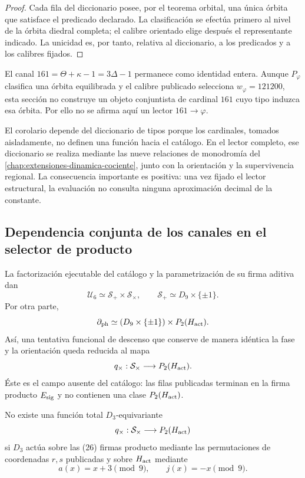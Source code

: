 \begin{proof}
Cada fila del diccionario posee, por el teorema orbital, una única órbita que
satisface el predicado declarado. La clasificación se efectúa primero al
nivel de la órbita diedral completa; el calibre orientado elige después el
representante indicado. La unicidad es, por tanto, relativa al diccionario,
a los predicados y a los calibres fijados.
\end{proof}

El canal \(161=\Theta+\kappa-1=3\Delta-1\) permanece como identidad entera.
Aunque \(P_\varphi\) clasifica una órbita equilibrada y el calibre publicado
selecciona \(w_\varphi=121200\), esta sección no construye un objeto
conjuntista de cardinal \(161\) cuyo tipo induzca esa órbita. Por ello no se
afirma aquí un lector \(161\to\varphi\).

El corolario depende del diccionario de tipos porque los cardinales, tomados
aisladamente, no definen una función hacia el catálogo. En el lector completo,
ese diccionario se realiza mediante las nueve relaciones de monodromía del
\cref{chap:extensiones-dinamica-cociente}, junto con la orientación y la
supervivencia regional. La consecuencia importante es positiva: una vez
fijado el lector estructural, la evaluación no consulta ninguna aproximación
decimal de la constante.

\subsection{Dependencia conjunta de los canales en el selector de producto}

La factorización ejecutable del catálogo y la parametrización de su firma
aditiva dan
\[
 \mathcal U_6\simeq\mathcal S_+\times\mathcal S_\times,
 \qquad
 \mathcal S_+\simeq D_9\times\{\pm1\}.
\]
Por otra parte,
\[
 \partial_{\rm ph}
 \simeq(D_9\times\{\pm1\})\times P_2(H_{\rm act}).
\]
Así, una tentativa funcional de descenso que conserve de manera idéntica la
fase y la orientación queda reducida al mapa
\[
 q_\times:\mathcal S_\times\longrightarrow P_2(H_{\rm act}).
\]
Éste es el campo ausente del catálogo: las filas publicadas terminan en la
firma producto \(E_{\rm sig}\) y no contienen una clase
\(P_2(H_{\rm act})\).

\begin{proposition}
\label{prop:nogo-selector-producto-d3}
No existe una función total \(D_3\)-equivariante
\[
 q_\times:\mathcal S_\times\longrightarrow P_2(H_{\rm act})
\]
si \(D_3\) actúa sobre las (26) firmas producto mediante las permutaciones
de coordenadas \(r,s\) publicadas y sobre \(H_{\rm act}\) mediante
\[
 a(x)=x+3\pmod9,
 \qquad
 j(x)=-x\pmod9.
\]
\end{proposition}

